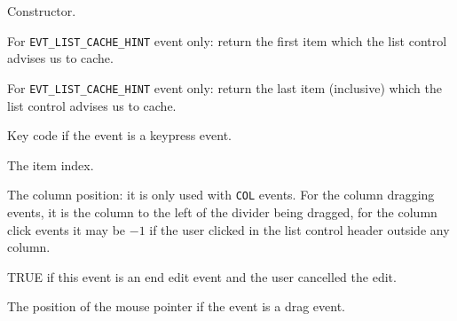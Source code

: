 


Constructor.

\label{wxlisteventgetcachefrom}


For {\tt EVT\_LIST\_CACHE\_HINT} event only: return the first item which the
list control advises us to cache.

\label{wxlisteventgetcacheto}


For {\tt EVT\_LIST\_CACHE\_HINT} event only: return the last item (inclusive)
which the list control advises us to cache.

\label{wxlisteventgetkeycode}


Key code if the event is a keypress event.

\label{wxlisteventgetindex}


The item index.

\label{wxlisteventgetcolumn}


The column position: it is only used with {\tt COL} events. For the column
dragging events, it is the column to the left of the divider being dragged, for
the column click events it may be $-1$ if the user clicked in the list control
header outside any column.

\label{wxlisteventcancelled}


TRUE if this event is an end edit event and the user cancelled the edit.

\label{wxlisteventgetpoint}


The position of the mouse pointer if the event is a drag event.


